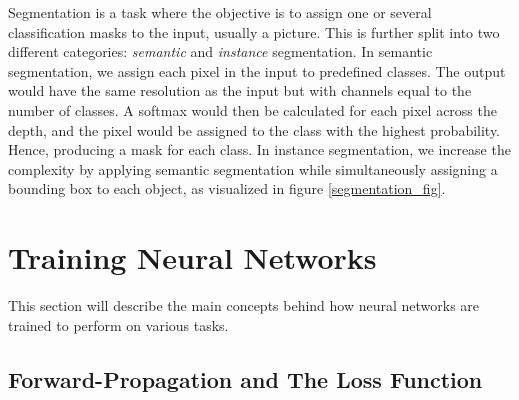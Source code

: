     Segmentation is a task where the objective is to assign one or several classification masks to the input, usually a picture\cite{He_2017_ICCV_segmentation}. This is further split into two different categories: \textit{semantic} and \textit{instance} segmentation. In semantic segmentation, we assign each pixel in the input to predefined classes. The output would have the same resolution as  the input but with channels equal to the number of classes. A softmax would then be calculated for each pixel across the depth, and the pixel would be assigned to the class with the highest probability. Hence, producing a mask for each class. In instance segmentation, we increase the complexity by applying semantic segmentation while simultaneously assigning a bounding box to each object, as visualized in figure \ref{segmentation_fig}.
    
\section{Training Neural Networks} \label{training neural networks}
    This section will describe the main concepts behind how neural networks are trained to perform on various tasks. 

\subsection{Forward-Propagation and The Loss Function}

